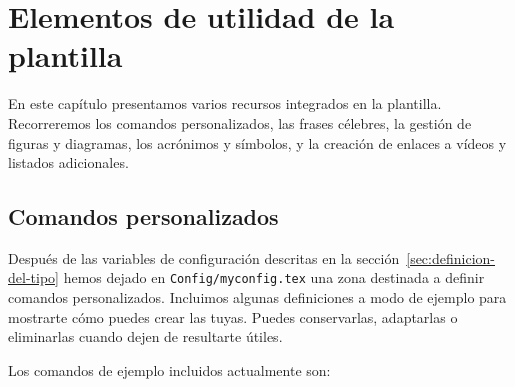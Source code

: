 %

\chapter{Elementos de utilidad de la plantilla}
\label{cha:elementos-utilidad}

En este capítulo presentamos varios recursos integrados en la plantilla. Recorreremos los comandos personalizados, las frases célebres, la gestión de figuras y diagramas, los acrónimos y símbolos, y la creación de enlaces a vídeos y listados adicionales.

\section{Comandos personalizados}
\label{sec:uso-de-comandos}

Después de las variables de configuración descritas en la sección~\ref{sec:definicion-del-tipo} hemos dejado en \texttt{Config/myconfig.tex} una zona destinada a definir comandos personalizados. Incluimos algunas definiciones a modo de ejemplo para mostrarte cómo puedes crear las tuyas. Puedes conservarlas, adaptarlas o eliminarlas cuando dejen de resultarte útiles.

Los comandos de ejemplo incluidos actualmente son:

